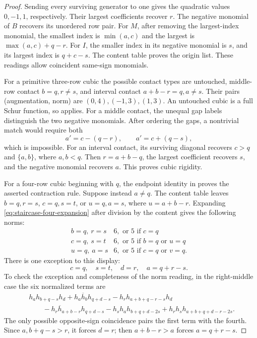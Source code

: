\documentclass[11pt,a4paper]{amsart}
\numberwithin{equation}{section}
\theoremstyle{plain}
\theoremstyle{definition}
\begin{document}
\begin{proof}
Sending every surviving generator to one gives the quadratic values
\(0,-1,1\), respectively.  Their largest coefficients recover \(r\).
The negative monomial of \(B\) recovers its unordered row pair.
For \(M\), after removing the largest-index monomial, the smallest
index is \(\min(a,c)\) and the largest is \(\max(a,c)+q-r\).
For \(I\), the smaller index in its negative monomial is \(s\), and
its largest index is \(q+c-s\).  The content table proves the origin
list.  These readings allow coincident same-sign monomials.

For a primitive three-row cubic the possible contact types are untouched,
middle-row contact \(b=q,r\ne s\), and interval contact
\(a+b-r=q,a\ne s\).  Their pairs (augmentation, norm) are
\((0,4),(-1,3),(1,3)\).  An untouched cubic is a full Schur function,
so  applies.  For a middle contact, the unequal gap
labels distinguish the two negative monomials.  After ordering the gaps,
a nontrivial match would require both
\[
 a'=c-(q-r),\qquad a'=c+(q-s),
\]
which is impossible.  For an interval contact, its surviving diagonal
recovers \(c>q\) and \(\{a,b\}\), where \(a,b<q\).  Then
\(r=a+b-q\), the largest coefficient recovers \(s\), and the negative
monomial recovers \(a\).  This proves cubic rigidity.

For a four-row cubic beginning with \(q\), the endpoint identity in
 proves the asserted contraction rule.
Suppose instead \(a\ne q\).  The content table leaves
\(b=q,r=s\), \(c=q,s=t\), or \(u=q,a=s\), where \(u=a+b-r\).
Expanding \eqref{eq:staircase-four-expansion} after division by the
content gives the following norms:
\[
\begin{array}{c|c}
 b=q,\ r=s&6,\text{ or }5\text{ if }c=q\\
 c=q,\ s=t&6,\text{ or }5\text{ if }b=q\text{ or }u=q\\
 u=q,\ a=s&6,\text{ or }5\text{ if }c=q\text{ or }v=q.
\end{array}
\]
There is one exception to this display:
\[
 c=q,\quad s=t,\quad d=r,\quad a=q+r-s.
\]
To check the exception and completeness of the norm reading, in the
right-middle case the six normalized terms are
\begin{align*}
 &h_ah_{b+q-s}h_d+h_a\overline h_bh_{q+d-s}
 -h_rh_{a+b+q-r-s}h_d\\
 &\qquad-h_r\overline h_{a+b-r}h_{q+d-s}
 -h_sh_ah_{b+q+d-2s}+h_rh_sh_{a+b+q+d-r-2s}.
\end{align*}
The only possible opposite-sign coincidence pairs the first term with
the fourth.  Since \(a,b+q-s>r\), it forces \(d=r\); then
\(a+b-r>a\) forces \(a=q+r-s\).


\end{proof}
\end{document}
